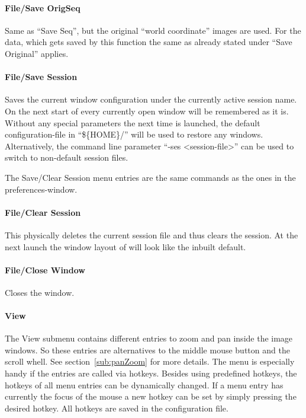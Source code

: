 \paragraph{File/Save OrigSeq}
Same as ``Save Seq'', but the original ``world coordinate'' images
are used. For the data, which gets saved by this function the same
as already stated under ``Save Original'' applies.

\paragraph{File/Save Session}
Saves the current \icewing{} window configuration under the
currently active session name. On the next start of \icewing{} every
currently open window will be remembered as it is. Without any
special parameters the next time \icewing{} is launched, the default
configuration-file in ``\$\{HOME\}/'' will
be used to restore any windows. Alternatively, the command line
parameter ``-ses \textless{}session-file\textgreater{}'' can be used
to switch to non-default session files.

The Save/Clear Session menu entries are the same commands as the
ones in the preferences-window.

\paragraph{File/Clear Session}
This physically deletes the current session file and thus clears the
session. At the next launch the window layout of \icewing{} will
look like the inbuilt default.

\paragraph{File/Close Window}
Closes the window.

\paragraph{View}
The View submenu contains different entries to zoom and pan inside
the image windows. So these entries are alternatives to the middle
mouse button and the scroll whell. See section~\ref{sub:panZoom} for
more details. The menu is especially handy if the entries are called
via hotkeys. Besides using predefined hotkeys, the hotkeys of all
menu entries can be dynamically changed. If a menu entry has
currently the focus of the mouse a new hotkey can be set by simply
pressing the desired hotkey. All hotkeys are saved in the
configuration file.

